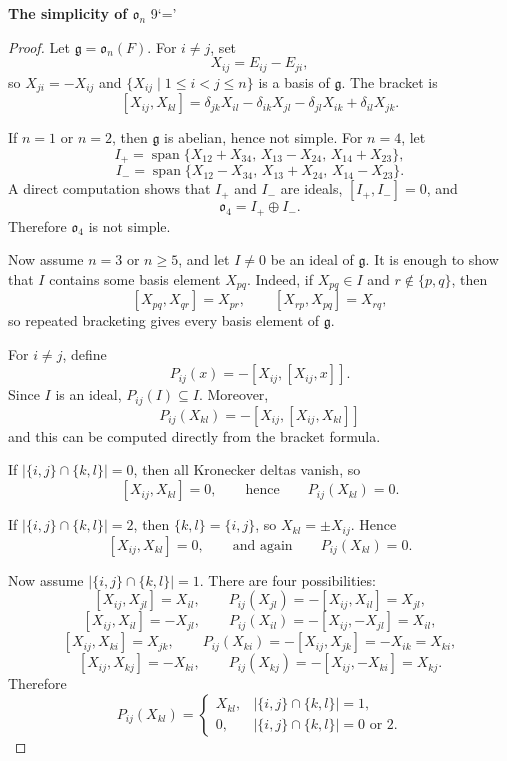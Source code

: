 \textbf{The simplicity of $\mathfrak{o}_n$}
9`='
\begin{proof}
    Let $\mathfrak{g}=\mathfrak{o}_n(F)$. For $i\neq j$, set
    \[
        X_{ij}=E_{ij}-E_{ji},
    \]
    so $X_{ji}=-X_{ij}$ and $\{X_{ij}\mid 1\le i<j\le n\}$ is a basis of $\mathfrak{g}$. The bracket is
    \[
        [X_{ij},X_{kl}]=\delta_{jk}X_{il}-\delta_{ik}X_{jl}-\delta_{jl}X_{ik}+\delta_{il}X_{jk}.
    \]

    If $n=1$ or $n=2$, then $\mathfrak{g}$ is abelian, hence not simple. For $n=4$, let
    \[
        I_+=\operatorname{span}\{X_{12}+X_{34},\,X_{13}-X_{24},\,X_{14}+X_{23}\},
    \]
    \[
        I_-=\operatorname{span}\{X_{12}-X_{34},\,X_{13}+X_{24},\,X_{14}-X_{23}\}.
    \]
    A direct computation shows that $I_+$ and $I_-$ are ideals, $[I_+,I_-]=0$, and
    \[
        \mathfrak{o}_4=I_+\oplus I_-.
    \]
    Therefore $\mathfrak{o}_4$ is not simple.

    Now assume $n=3$ or $n\ge5$, and let $I\neq0$ be an ideal of $\mathfrak{g}$. It is enough to show that $I$ contains some basis element $X_{pq}$. Indeed, if $X_{pq}\in I$ and $r\notin\{p,q\}$, then
    \[
        [X_{pq},X_{qr}]=X_{pr},\qquad [X_{rp},X_{pq}]=X_{rq},
    \]
    so repeated bracketing gives every basis element of $\mathfrak{g}$.

    For $i\neq j$, define
    \[
        P_{ij}(x)=-[X_{ij},[X_{ij},x]].
    \]
    Since $I$ is an ideal, $P_{ij}(I)\subseteq I$. Moreover,
    \[
        P_{ij}(X_{kl})=-[X_{ij},[X_{ij},X_{kl}]]
    \]
    and this can be computed directly from the bracket formula.

    If $|\{i,j\}\cap\{k,l\}|=0$, then all Kronecker deltas vanish, so
    \[
        [X_{ij},X_{kl}]=0,
        \qquad\text{hence}\qquad
        P_{ij}(X_{kl})=0.
    \]

    If $|\{i,j\}\cap\{k,l\}|=2$, then $\{k,l\}=\{i,j\}$, so $X_{kl}=\pm X_{ij}$. Hence
    \[
        [X_{ij},X_{kl}]=0,
        \qquad\text{and again}\qquad
        P_{ij}(X_{kl})=0.
    \]

    Now assume $|\{i,j\}\cap\{k,l\}|=1$. There are four possibilities:
    \[
        [X_{ij},X_{jl}]=X_{il}, \qquad
        P_{ij}(X_{jl})=-[X_{ij},X_{il}]=X_{jl},
    \]
    \[
        [X_{ij},X_{il}]=-X_{jl}, \qquad
        P_{ij}(X_{il})=-[X_{ij},-X_{jl}]=X_{il},
    \]
    \[
        [X_{ij},X_{ki}]=X_{jk}, \qquad
        P_{ij}(X_{ki})=-[X_{ij},X_{jk}]=-X_{ik}=X_{ki},
    \]
    \[
        [X_{ij},X_{kj}]=-X_{ki}, \qquad
        P_{ij}(X_{kj})=-[X_{ij},-X_{ki}]=X_{kj}.
    \]
    Therefore
    \[
        P_{ij}(X_{kl})=
        \begin{cases}
            X_{kl}, & |\{i,j\}\cap\{k,l\}|=1,               \\
            0,      & |\{i,j\}\cap\{k,l\}|=0 \text{ or } 2.
        \end{cases}
    \]


\end{proof}
